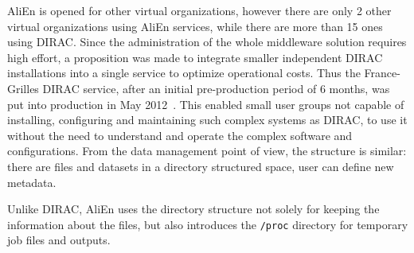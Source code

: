 AliEn is opened for other virtual organizations, however there are only 2 other virtual organizations using 
AliEn services, while there are more than 15 ones using DIRAC. Since the administration of the whole middleware 
solution requires high effort, a proposition was made to integrate smaller independent DIRAC installations into 
a single service to optimize operational costs. Thus the France-Grilles DIRAC service, 
after an initial pre-production period of 6 months, was put into production in May 2012~\cite{FGDIRAC}.
This enabled small user groups not capable of installing, configuring and maintaining  
such complex systems as DIRAC, to use it without the need to understand and operate the complex software and
configurations. From the data management point of view, the  structure is similar: there are files and datasets in a 
directory structured space, user can define new metadata.


Unlike DIRAC, AliEn uses the directory structure not solely for keeping the information about the files, 
but also introduces the \texttt{/proc} directory for temporary job files and outputs.